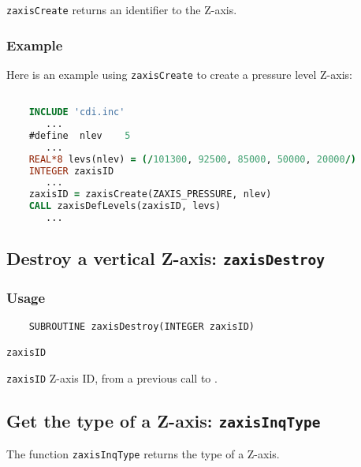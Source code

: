 {\texttt{zaxisCreate}} returns an identifier to the Z-axis.


\subsubsection*{Example}

Here is an example using {\texttt{zaxisCreate}} to create a pressure level Z-axis:

\begin{lstlisting}[language=Fortran, backgroundcolor=\color{pyellow}, basicstyle=\small, columns=flexible]

    INCLUDE 'cdi.inc'
       ...
    #define  nlev    5
       ...
    REAL*8 levs(nlev) = (/101300, 92500, 85000, 50000, 20000/)
    INTEGER zaxisID
       ...
    zaxisID = zaxisCreate(ZAXIS_PRESSURE, nlev)
    CALL zaxisDefLevels(zaxisID, levs)
       ...
\end{lstlisting}


\subsection{Destroy a vertical Z-axis: \texttt{zaxisDestroy}}
\label{zaxisDestroy}
\subsubsection*{Usage}

\begin{verbatim}
    SUBROUTINE zaxisDestroy(INTEGER zaxisID)
\end{verbatim}

\hspace*{4mm}\begin{minipage}[]{15cm}
\begin{deflist}{\texttt{zaxisID}\ }
\item[\texttt{zaxisID}]
Z-axis ID, from a previous call to {}.

\end{deflist}
\end{minipage}


\subsection{Get the type of a Z-axis: \texttt{zaxisInqType}}
\label{zaxisInqType}

The function {\texttt{zaxisInqType}} returns the type of a Z-axis.


